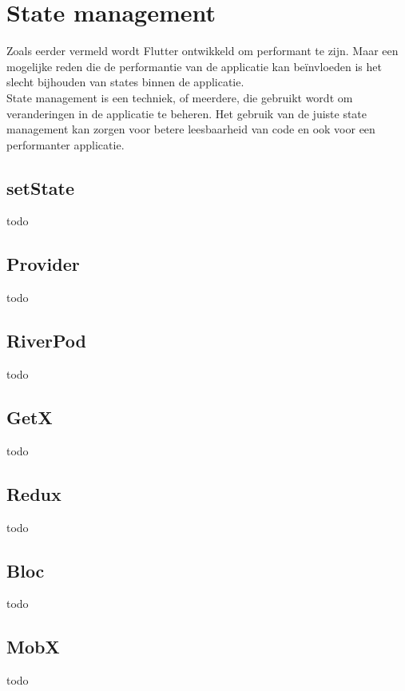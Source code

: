 \section{{State management}}%
\label{sec:State management}
Zoals eerder vermeld wordt Flutter ontwikkeld om performant te zijn. Maar een mogelijke reden die de performantie van de applicatie kan beïnvloeden is het slecht 
bijhouden van states binnen de applicatie.
\\
State management is een techniek, of meerdere, die gebruikt wordt om veranderingen in de applicatie te beheren. Het gebruik van de juiste state management kan zorgen 
voor betere leesbaarheid van code en ook voor een performanter applicatie. 
\subsection{{setState}}%
\label{sec:setState}
todo
\\
\subsection{{Provider}}%
\label{sec:Provider}
todo
\\
\subsection{{RiverPod}}%
\label{sec:RiverPod}
todo
\\
\subsection{{GetX}}%
\label{sec:GetX}
todo
\\
\subsection{{Redux}}%
\label{sec:Redux}
todo
\\
\subsection{{Bloc}}%
\label{sec:Bloc}
todo
\\
\subsection{{MobX}}%
\label{sec:MobX}
todo

